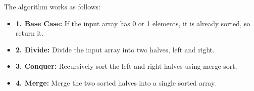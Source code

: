 \documentclass[sigplan,screen]{acmart}
\begin{document}
The algorithm works as follows:

\begin{itemize}
	\item \textbf{1. Base Case:} If the input array has 0 or 1 elements, it is already sorted, so return it.
	\item \textbf{2. Divide:} Divide the input array into two halves, left and right.
	\item \textbf{3. Conquer:} Recursively sort the left and right halves using merge sort.
	\item \textbf{4. Merge:} Merge the two sorted halves into a single sorted array.
\end{itemize}


    
    \def\lvld{1.2}                  %
    \pgfmathsetmacro\shft{-6*\lvld} %
    
\end{document}
